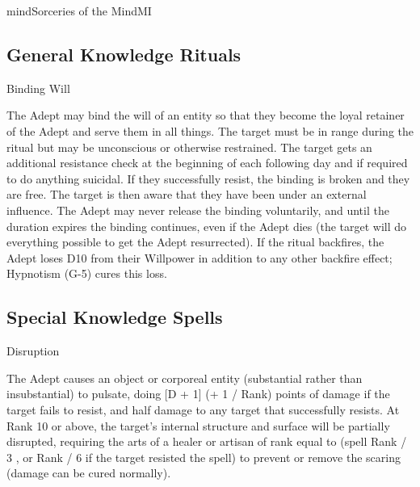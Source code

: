 \begin{college}[1.6]{mind}{Sorceries of the Mind}{MI}
\subsection{General Knowledge Rituals}

\begin{ritual}[Q-1]{Binding Will}
\begin{effects}
The Adept may bind the will of an entity so that they become the loyal
retainer of the Adept and serve them in all things.  The target must
be in range during the ritual but may be unconscious or otherwise
restrained. The target gets an additional resistance check at the
beginning of each following day and if required to do anything
suicidal. If they successfully resist, the binding is broken and they
are free. The target is then aware that they have been under an
external influence. The Adept may never release the binding
voluntarily, and until the duration expires the binding continues,
even if the Adept dies (the target will do everything possible to get
the Adept resurrected).  If the ritual backfires, the Adept loses D10
from their Willpower in addition to any other backfire effect;
Hypnotism (G-5) cures this loss.
\end{effects}
\end{ritual}

\subsection{Special Knowledge Spells}

\begin{spell}[S-1]{Disruption}

\begin{effects}
The Adept causes an object or corporeal entity (substantial rather
than insubstantial) to pulsate, doing [D + 1] (+ 1 / Rank) points of
damage if the target fails to resist, and half damage to any target
that successfully resists. At Rank 10 or above, the target's internal
structure and surface will be partially disrupted, requiring the arts
of a healer or artisan of rank equal to (spell Rank / 3 , or Rank / 6
if the target resisted the spell) to prevent or remove the scaring
(damage can be cured normally).
\end{effects}
\end{spell}


\end{college}
